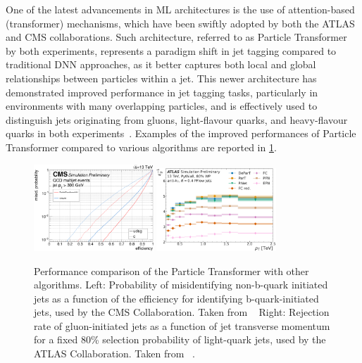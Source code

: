\documentclass[a4paper,11pt]{article}
\begin{document}
One of the latest advancements in ML architectures is the use of attention-based (transformer) mechanisms,
which have been swiftly adopted by both the ATLAS and CMS collaborations.
Such architecture, referred to as Particle Transformer~\cite{qu2024particletransformerjettagging} by both experiments,
represents a paradigm shift in jet tagging compared to traditional DNN approaches, as it better captures
both local and global relationships between particles within a jet.
This newer architecture has demonstrated improved performance in jet tagging tasks,
particularly in environments with many overlapping particles, and is effectively used
to distinguish jets originating from gluons, light-flavour quarks, and heavy-flavour quarks in both experiments~\cite{CMS-DP-2022-050,ATL-PHYS-PUB-2023-032}. Examples of the improved performances of Particle Transformer compared to various algorithms are reported in \cref{fig:PartT}.

\begin{figure}[t]
\centering
\includegraphics[width=0.40\textwidth]{figure_CMS_PartT.png}
\includegraphics[width=0.40\textwidth]{figure_ATLAS_PartT.pdf}
\caption{
Performance comparison of the Particle Transformer with other algorithms.
Left: Probability of misidentifying non-b-quark initiated jets as a function of the efficiency for identifying b-quark-initiated jets, used by the CMS Collaboration. Taken from ~\cite{CMS-DP-2022-050}
Right: Rejection rate of gluon-initiated jets as a function of jet transverse momentum for a fixed 80\% selection probability of light-quark jets, used by the ATLAS Collaboration. Taken from ~\cite{ATL-PHYS-PUB-2023-032}.
}
\label{fig:PartT}
\end{figure}
\end{document}
